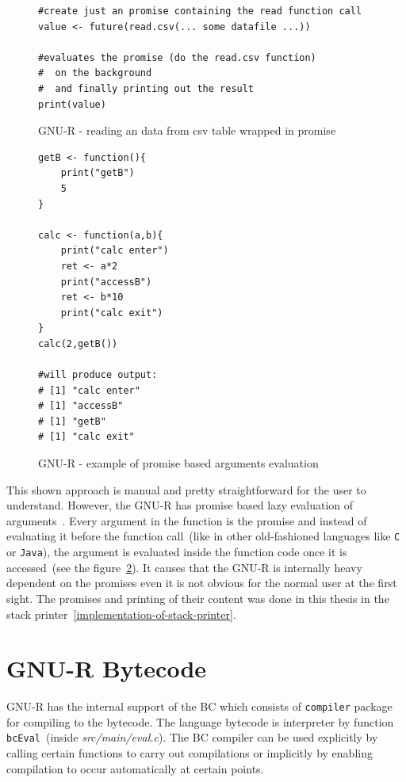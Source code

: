 \documentclass[thesis=M,english]{FITthesis}[2018/10/20]
\newcommand{\code}[1]{\texttt{#1}}
\begin{document}
\begin{figure}[H]
\begin{lstlisting}
#create just an promise containing the read function call
value <- future(read.csv(... some datafile ...))

#evaluates the promise (do the read.csv function)
#  on the background
#  and finally printing out the result
print(value)
\end{lstlisting}
\caption{\label{fig:reading-csv-with-promise} GNU-R - reading an data from csv table wrapped in promise}
\end{figure}


\begin{figure}[H]
\begin{lstlisting}
getB <- function(){
	print("getB")
	5
}

calc <- function(a,b){
	print("calc enter")
	ret <- a*2
	print("accessB")
	ret <- b*10
	print("calc exit")
}
calc(2,getB())

#will produce output:
# [1] "calc enter"
# [1] "accessB"
# [1] "getB"
# [1] "calc exit"
\end{lstlisting}
\caption{\label{fig:gnu-r-promise-arguments} GNU-R - example of promise based arguments evaluation}
\end{figure}

This shown approach is manual and pretty straightforward for the user to understand. However, the GNU-R has promise based lazy evaluation of arguments~\cite{R_PERFORMANCE}. Every argument in the function is the promise and instead of evaluating it before the function call~(like in other old-fashioned languages like \code{C} or \code{Java}), the argument is evaluated inside the function code once it is accessed~(see the figure~\ref{fig:gnu-r-promise-arguments}). It causes that the GNU-R is internally heavy dependent on the promises even it is not obvious for the normal user at the first sight. The promises and printing of their content was done in this thesis in the stack printer~\ref{implementation-of-stack-printer}.


\section{GNU-R Bytecode}

GNU-R has the internal support of the BC which consists of \code{compiler} package for compiling to the bytecode. The language bytecode is interpreter by function \code{bcEval}~(inside \textit{src/main/eval.c}). The BC compiler can be used explicitly by calling certain functions to carry out compilations or implicitly by enabling compilation to occur automatically at certain points.
\end{document}
